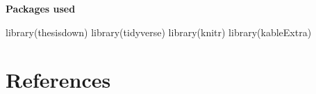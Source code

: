 \documentclass[12pt,twoside]{reedthesis}
\newenvironment{Shaded}{\begin{snugshade}}{\end{snugshade}}
\newcommand{\FunctionTok}[1]{\textcolor[rgb]{0.00,0.00,0.00}{#1}}
\newcommand{\NormalTok}[1]{#1}
\begin{document}
\textbf{Packages used}
\begin{Shaded}
\begin{Highlighting}[]
\FunctionTok{library}\NormalTok{(thesisdown)}
\FunctionTok{library}\NormalTok{(tidyverse) }
\FunctionTok{library}\NormalTok{(knitr)}
\FunctionTok{library}\NormalTok{(kableExtra)}
\end{Highlighting}
\end{Shaded}
\backmatter

\hypertarget{references}{%
\chapter*{References}\label{references}}


\noindent

\setlength{\parindent}{-0.20in}
\setlength{\leftskip}{0.20in}
\setlength{\parskip}{8pt}
\end{document}
